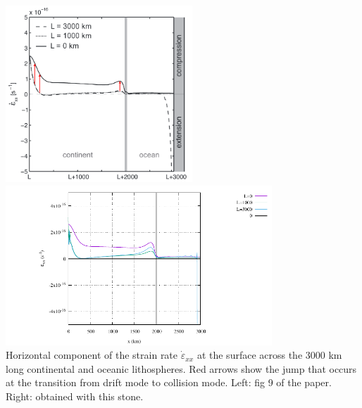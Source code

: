 \begin{center}
\includegraphics[width=7cm]{python_codes/fieldstone_143/images/fig9}
\includegraphics[width=10cm]{python_codes/fieldstone_143/results/fig9/fig9}\\
{\captionfont Horizontal component of the strain rate $\dot{\varepsilon}_{xx}$ at
the surface across the 3000 km long continental and oceanic
lithospheres. Red arrows show the jump that occurs at the
transition from drift mode to collision mode.
Left: fig 9 of the paper. Right: obtained with this stone.}
\end{center}



